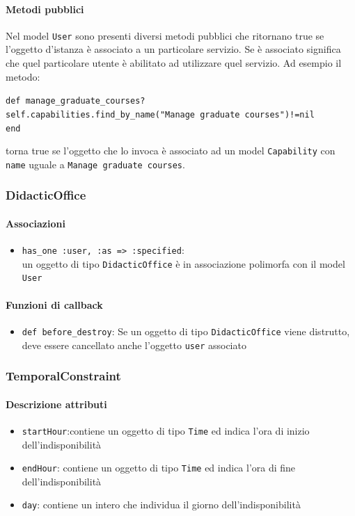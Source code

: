 \documentclass[11pt,a4paper]{article}
\begin{document}
\paragraph{Metodi pubblici}
Nel model \verb|User| sono presenti diversi metodi pubblici che ritornano true se l'oggetto d'istanza è associato a un particolare servizio. Se è associato significa che quel particolare utente è abilitato ad utilizzare quel servizio.
Ad esempio il metodo:
\begin{center}
 \verb|def manage_graduate_courses?|\\
    \verb|self.capabilities.find_by_name("Manage graduate courses")!=nil|\\
  \verb|end|\\
\end{center}
 torna true se l'oggetto che lo invoca è associato ad un model \verb|Capability| con \verb|name| uguale a \verb|Manage graduate courses|.
\subsubsection{DidacticOffice}
\paragraph{Associazioni}
\begin{itemize}
 \item \verb|has_one :user, :as => :specified|:\\ un oggetto di tipo \verb|DidacticOffice| è in associazione polimorfa con il model \verb|User| 
\end{itemize}
\paragraph{Funzioni di callback}
\begin{itemize}
 \item \verb|def before_destroy|: Se un oggetto di tipo \verb|DidacticOffice| viene distrutto, deve essere cancellato anche l'oggetto \verb|user| associato
\end{itemize}
\subsubsection{TemporalConstraint}
\paragraph{Descrizione attributi}
\begin{itemize}
 \item \verb|startHour|:contiene un oggetto di tipo \verb|Time| ed indica l'ora di inizio dell'indisponibilità
 \item \verb|endHour|: contiene un oggetto di tipo \verb|Time| ed indica l'ora di fine dell'indisponibilità
 \item \verb|day|: contiene un intero che individua il giorno dell'indisponibilità
\end{itemize}
\end{document}
